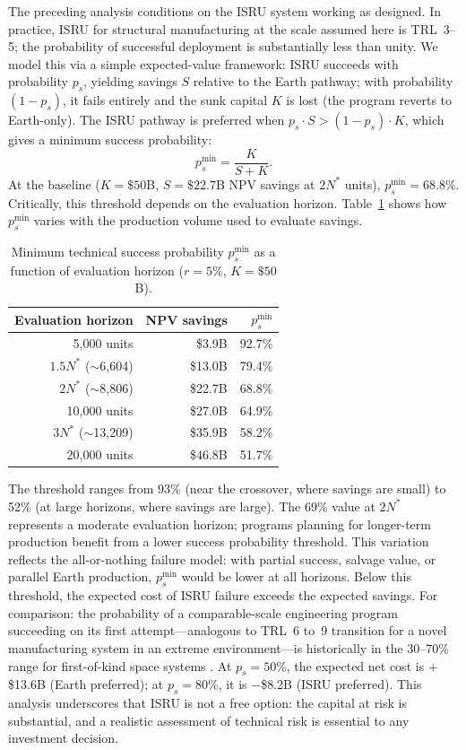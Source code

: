 \documentclass[preprint,12pt]{elsarticle}
\begin{document}
The preceding analysis conditions on the ISRU system working as designed. In practice, ISRU for structural manufacturing at the scale assumed here is TRL~3--5; the probability of successful deployment is substantially less than unity. We model this via a simple expected-value framework: ISRU succeeds with probability $p_s$, yielding savings $S$ relative to the Earth pathway; with probability $(1 - p_s)$, it fails entirely and the sunk capital $K$ is lost (the program reverts to Earth-only). The ISRU pathway is preferred when $p_s \cdot S > (1 - p_s) \cdot K$, which gives a minimum success probability:
\begin{equation}
  p_s^{\min} = \frac{K}{S + K}.
  \label{eq:p_success}
\end{equation}
At the baseline ($K = \$50$B, $S = \$22.7$B NPV savings at $2N^*$ units), $p_s^{\min} = 68.8\%$. Critically, this threshold depends on the evaluation horizon. Table~\ref{tab:ps_horizon} shows how $p_s^{\min}$ varies with the production volume used to evaluate savings.

\begin{table}[htbp]
\centering
\caption{Minimum technical success probability $p_s^{\min}$ as a function of evaluation horizon ($r = 5\%$, $K = \$50$B).}
\label{tab:ps_horizon}
\small
\begin{tabular}{@{}rrr@{}}
\toprule
Evaluation horizon & NPV savings & $p_s^{\min}$ \\
\midrule
5{,}000 units            & \$3.9B   & 92.7\% \\
$1.5 N^*$ ($\sim$6{,}604) & \$13.0B  & 79.4\% \\
$2 N^*$ ($\sim$8{,}806)   & \$22.7B  & 68.8\% \\
10{,}000 units           & \$27.0B  & 64.9\% \\
$3 N^*$ ($\sim$13{,}209)  & \$35.9B  & 58.2\% \\
20{,}000 units           & \$46.8B  & 51.7\% \\
\bottomrule
\end{tabular}
\end{table}

The threshold ranges from 93\% (near the crossover, where savings are small) to 52\% (at large horizons, where savings are large). The 69\% value at $2N^*$ represents a moderate evaluation horizon; programs planning for longer-term production benefit from a lower success probability threshold. This variation reflects the all-or-nothing failure model: with partial success, salvage value, or parallel Earth production, $p_s^{\min}$ would be lower at all horizons. Below this threshold, the expected cost of ISRU failure exceeds the expected savings. For comparison: the probability of a comparable-scale engineering program succeeding on its first attempt---analogous to TRL~6 to~9 transition for a novel manufacturing system in an extreme environment---is historically in the 30--70\% range for first-of-kind space systems \cite{wertz2011}. At $p_s = 50\%$, the expected net cost is $+$\$13.6B (Earth preferred); at $p_s = 80\%$, it is $-$\$8.2B (ISRU preferred). This analysis underscores that ISRU is not a free option: the capital at risk is substantial, and a realistic assessment of technical risk is essential to any investment decision.
\end{document}
